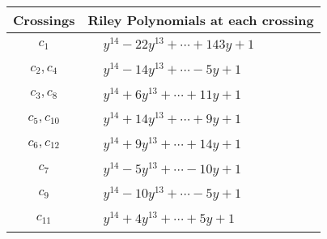 \documentclass[1p]{elsarticle_modified}
\theoremstyle{definition}
\begin{document}
\begin{tabular}{m{50pt}|m{274pt}}
Crossings & \hspace{64pt}Riley Polynomials at each crossing \\
\hline $$\begin{aligned}c_{1}\end{aligned}$$&$\begin{aligned}
&y^{14}-22 y^{13}+\cdots+143 y+1
\end{aligned}$\\
\hline $$\begin{aligned}c_{2},c_{4}\end{aligned}$$&$\begin{aligned}
&y^{14}-14 y^{13}+\cdots-5 y+1
\end{aligned}$\\
\hline $$\begin{aligned}c_{3},c_{8}\end{aligned}$$&$\begin{aligned}
&y^{14}+6 y^{13}+\cdots+11 y+1
\end{aligned}$\\
\hline $$\begin{aligned}c_{5},c_{10}\end{aligned}$$&$\begin{aligned}
&y^{14}+14 y^{13}+\cdots+9 y+1
\end{aligned}$\\
\hline $$\begin{aligned}c_{6},c_{12}\end{aligned}$$&$\begin{aligned}
&y^{14}+9 y^{13}+\cdots+14 y+1
\end{aligned}$\\
\hline $$\begin{aligned}c_{7}\end{aligned}$$&$\begin{aligned}
&y^{14}-5 y^{13}+\cdots-10 y+1
\end{aligned}$\\
\hline $$\begin{aligned}c_{9}\end{aligned}$$&$\begin{aligned}
&y^{14}-10 y^{13}+\cdots-5 y+1
\end{aligned}$\\
\hline $$\begin{aligned}c_{11}\end{aligned}$$&$\begin{aligned}
&y^{14}+4 y^{13}+\cdots+5 y+1
\end{aligned}$\\
\hline
\end{tabular}\\~\\
\end{document}

